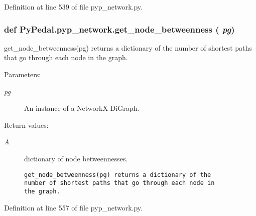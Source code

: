 Definition at line 539 of file pyp\_\-network.py.\hypertarget{namespacePyPedal_1_1pyp__network_5e1ef79a65c97a5554050f4941b99c22}{
\subsubsection[get\_\-node\_\-betweenness]{\setlength{\rightskip}{0pt plus 5cm}def Py\-Pedal.pyp\_\-network.get\_\-node\_\-betweenness ( {\em pg})}}
\label{namespacePyPedal_1_1pyp__network_5e1ef79a65c97a5554050f4941b99c22}


get\_\-node\_\-betweenness(pg) returns a dictionary of the number of shortest paths that go through each node in the graph. 

\begin{Desc}
\item[Parameters:]
\begin{description}
\item[{\em pg}]An instance of a Network\-X Di\-Graph. \end{description}
\end{Desc}
\begin{Desc}
\item[Return values:]
\begin{description}
\item[{\em A}]dictionary of node betweennesses.

\footnotesize\begin{verbatim}get_node_betweenness(pg) returns a dictionary of the
number of shortest paths that go through each node in
the graph.
\end{verbatim}
\normalsize
 \end{description}
\end{Desc}


Definition at line 557 of file pyp\_\-network.py.